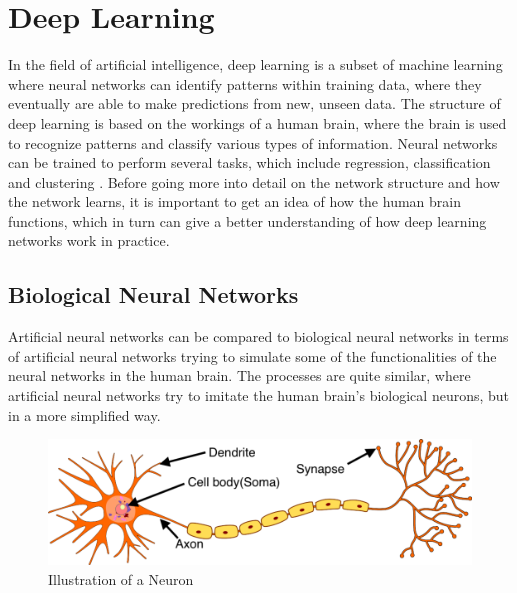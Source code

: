 \section{Deep Learning}
In the field of artificial intelligence, deep learning is a subset of machine learning where neural networks can identify patterns within training data, where they eventually are able to make predictions from new, unseen data. The structure of deep learning is based on the workings of a human brain, where the brain is used to recognize patterns and classify various types of information. Neural networks can be trained to perform several tasks, which include regression, classification and clustering \cite{opper}. Before going more into detail on the network structure and how the network learns, it is important to get an idea of how the human brain functions, which in turn can give a better understanding of how deep learning networks work in practice.

\subsection{Biological Neural Networks}
Artificial neural networks can be compared to biological neural networks in terms of artificial neural networks trying to simulate some of the functionalities of the neural networks in the human brain. The processes are quite similar, where artificial neural networks try to imitate the human brain's biological neurons, but in a more simplified way.  

\indent\newline
\begin{figure}[H]
\centering
\includegraphics [scale=0.34,angle=360]{figures/bio.png}
\caption{Illustration of a Neuron \cite{mhatre}}
\label{fig:bio}
\end{figure}
 
